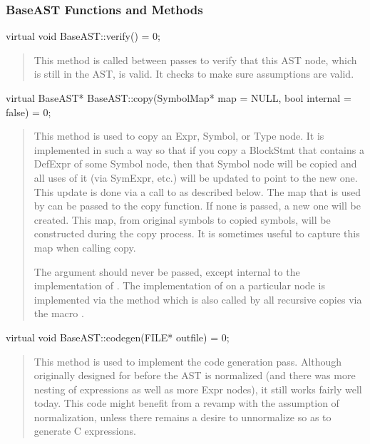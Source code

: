 \documentclass[10pt]{article}
\begin{document}
\subsubsection{BaseAST Functions and Methods}
\label{sec:BaseASTutils}

\begin{clang}
virtual void BaseAST::verify() = 0;
\end{clang}
\begin{quote}
This method is called between passes to verify that this AST node,
which is still in the AST, is valid.  It checks to make sure
assumptions are valid.
\end{quote}

\begin{clang}
virtual BaseAST* BaseAST::copy(SymbolMap* map = NULL, bool internal = false) = 0;
\end{clang}
\begin{quote}
This method is used to copy an Expr, Symbol, or Type node.  It is
implemented in such a way so that if you copy a BlockStmt that
contains a DefExpr of some Symbol node, then that Symbol node will be
copied and all uses of it (via SymExpr, etc.) will be updated to point
to the new one.  This update is done via a call to 
as described below.  The map that is used by  can
be passed to the copy function.  If none is passed, a new one will be
created.  This map, from original symbols to copied symbols, will be
constructed during the copy process.  It is sometimes useful to
capture this map when calling copy.

The argument  should never be passed, except internal to
the implementation of .  The implementation of  on a
particular node is implemented via the method  which is
also called by all recursive copies via the macro .
\end{quote}

\begin{clang}
virtual void BaseAST::codegen(FILE* outfile) = 0;
\end{clang}
\begin{quote}
This method is used to implement the code generation pass.  Although
originally designed for before the AST is normalized (and there was
more nesting of expressions as well as more Expr nodes), it still
works fairly well today.  This code might benefit from a revamp with
the assumption of normalization, unless there remains a desire to
unnormalize so as to generate C expressions.
\end{quote}
\end{document}
